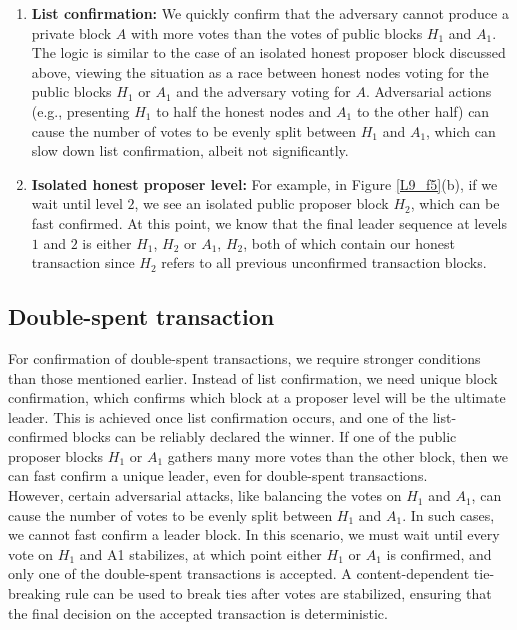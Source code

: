 \begin{enumerate}
	\item \textbf{List confirmation:} We quickly confirm that the adversary cannot produce a private block $A$ with more votes than the votes of public blocks $H_{1}$ and $A_{1}$. The logic is similar to the case of an isolated honest proposer block discussed above, viewing the situation as a race between honest nodes voting for the public blocks $H_{1}$ or $A_{1}$ and the adversary voting for $A$. Adversarial actions (e.g., presenting $H_{1}$ to half the honest nodes and $A_{1}$ to the other half) can cause the number of votes to be evenly split between $H_{1}$ and $A_{1}$, which can slow down list confirmation, albeit not significantly.
	\item \textbf{Isolated honest proposer level:} For example, in Figure \ref{L9_f5}(b), if we wait until level $2$, we see an isolated public proposer block $H_{2}$, which can be fast confirmed. At this point, we know that the final leader sequence at levels $1$ and $2$ is either $H_{1}$, $H_{2}$ or $A_{1}$, $H_{2}$, both of which contain our honest transaction since $H_{2}$ refers to all previous unconfirmed transaction blocks.
\end{enumerate}
\subsection{Double-spent transaction}
For confirmation of double-spent transactions, we require stronger conditions than those mentioned earlier. Instead of list confirmation, we need unique block confirmation, which confirms which block at a proposer level will be the ultimate leader. This is achieved once list confirmation occurs, and one of the list-confirmed blocks can be reliably declared the winner. If one of the public proposer blocks $H_{1}$ or $A_{1}$ gathers many more votes than the other block, then we can fast confirm a unique leader, even for double-spent transactions.\\
However, certain adversarial attacks, like balancing the votes on $H_{1}$ and $A_{1}$, can cause the number of votes to be evenly split between $H_{1}$ and $A_{1}$. In such cases, we cannot fast confirm a leader block. In this scenario, we must wait until every vote on $H_{1}$ and A1 stabilizes, at which point either $H_{1}$ or $A_{1}$ is confirmed, and only one of the double-spent transactions is accepted. A content-dependent tie-breaking rule can be used to break ties after votes are stabilized, ensuring that the final decision on the accepted transaction is deterministic.
